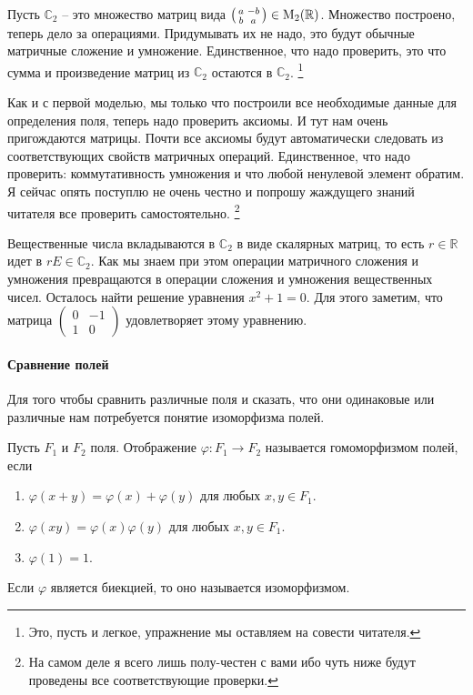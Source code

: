 Пусть $\mathbb C_2$ -- это множество матриц вида $\left(\begin{smallmatrix}{a}&{-b}\\{b}&{a}\end{smallmatrix}\right)\in\operatorname{M}_{2}(\mathbb R)$.
Множество построено, теперь дело за операциями.
Придумывать их не надо, это будут обычные матричные сложение и умножение.
Единственное, что надо проверить, это что сумма и произведение матриц из $\mathbb C_2$ остаются в $\mathbb C_2$.%
\footnote{Это, пусть и легкое, упражнение мы оставляем на совести читателя.} 

Как и с первой моделью, мы только что построили все необходимые данные для определения поля, теперь надо проверить аксиомы.
И тут нам очень пригождаются матрицы.
Почти все аксиомы будут автоматически следовать из соответствующих свойств матричных операций.
Единственное, что надо проверить: коммутативность умножения и что любой ненулевой элемент обратим.
Я сейчас опять поступлю не очень честно и попрошу жаждущего знаний читателя все проверить самостоятельно.%
\footnote{На самом деле я всего лишь полу-честен с вами ибо чуть ниже будут проведены все соответствующие проверки.}

Вещественные числа вкладываются в $\mathbb C_2$ в виде скалярных матриц, то есть $r\in\mathbb R$ идет в $rE\in\mathbb C_2$.
Как мы знаем при этом операции матричного сложения и умножения превращаются в операции сложения и умножения вещественных чисел.
Осталось найти решение уравнения $x^2+1 = 0$.
Для этого заметим, что матрица $\left(\begin{smallmatrix}{0}&{-1}\\{1}&{0}\end{smallmatrix}\right)$ удовлетворяет этому уравнению.

\paragraph{Сравнение полей}

Для того чтобы сравнить различные поля и сказать, что они одинаковые или различные нам потребуется понятие изоморфизма полей.

\begin{definition}
\label{def::FieldsHom}
Пусть $F_1$ и $F_2$ поля.
Отображение $\varphi\colon F_1\to F_2$ называется гомоморфизмом полей, если 
\begin{enumerate}
\item $\varphi(x+y) = \varphi(x) + \varphi(y)$ для любых $x,y\in F_1$.

\item $\varphi(xy) = \varphi(x)\varphi(y)$ для любых $x,y\in F_1$.

\item $\varphi(1) = 1$.
\end{enumerate}
Если $\varphi$ является биекцией, то оно называется изоморфизмом.
\end{definition}

